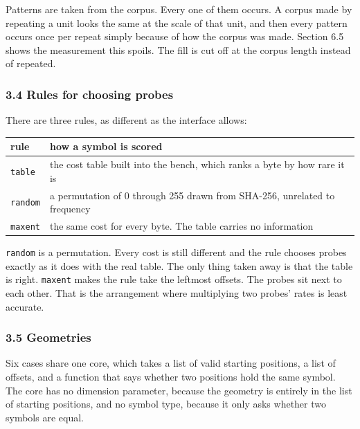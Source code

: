 Patterns are taken from the corpus. Every one of them occurs. A corpus made by repeating a unit
looks the same at the scale of that unit, and then every pattern occurs once per repeat simply
because of how the corpus was made. Section 6.5 shows the measurement this spoils. The fill is cut
off at the corpus length instead of repeated.

\subsubsection{3.4 Rules for choosing probes}

There are three rules, as different as the interface allows:

\tiny
\setlength{\tabcolsep}{2pt}
\begin{longtable}{@{}>{\raggedright\arraybackslash}p{}>{\raggedright\arraybackslash}p{}@{}}
\toprule
rule & how a symbol is scored \\
\midrule
\texttt{table} & the cost table built into the bench, which ranks a byte by how rare it is \\
\texttt{random} & a permutation of 0 through 255 drawn from SHA-256, unrelated to frequency \\
\texttt{maxent} & the same cost for every byte. The table carries no information \\
\bottomrule
\end{longtable}
\normalsize

\texttt{random} is a permutation. Every cost is still different and the rule chooses probes
exactly as it does with the real table. The only thing taken away is that the table is right.
\texttt{maxent} makes the rule take the leftmost offsets. The probes sit next to each other.
That is the arrangement where multiplying two probes' rates is least accurate.

\subsubsection{3.5 Geometries}

Six cases share one core, which takes a list of valid starting positions, a list of offsets, and a function that says whether two positions hold the same symbol. The core has no dimension parameter, because the geometry is entirely in the list of starting positions, and no symbol type, because it only asks whether two symbols are equal.

